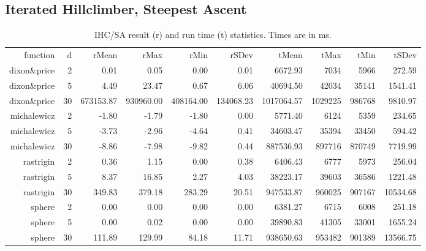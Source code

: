 \documentclass{article}
\begin{document}
    \newpage

	\subsection{Iterated Hillclimber, Steepest Ascent}
	\begin{table}[!ht]
        \centering
        {\footnotesize
        \begin{tabular}{rr|rrrrrrrr}
            function & d & rMean & rMax & rMin & rSDev & tMean & tMax & tMin & tSDev \\ 
            dixon\&price & 2 & 0.01 & 0.05 & 0.00 & 0.01 & 6672.93 & 7034 & 5966 & 272.59 \\  \hline
            dixon\&price & 5 & 4.49 & 23.47 & 0.67 & 6.06 & 40694.50 & 42034 & 35141 & 1541.41 \\  \hline
            dixon\&price & 30 & 673153.87 & 930960.00 & 408164.00 & 134068.23 & 1017064.57 & 1029225 & 986768 & 9810.97 \\  \hline
            michalewicz & 2 & -1.80 & -1.79 & -1.80 & 0.00 & 5771.40 & 6124 & 5359 & 234.65 \\  \hline
            michalewicz & 5 & -3.73 & -2.96 & -4.64 & 0.41 & 34603.47 & 35394 & 33450 & 594.42 \\  \hline
            michalewicz & 30 & -8.86 & -7.98 & -9.82 & 0.44 & 887536.93 & 897716 & 870749 & 7719.99 \\  \hline
            rastrigin & 2 & 0.36 & 1.15 & 0.00 & 0.38 & 6406.43 & 6777 & 5973 & 256.04 \\  \hline
            rastrigin & 5 & 8.37 & 16.85 & 2.27 & 4.03 & 38223.17 & 39603 & 36586 & 1221.48 \\  \hline
            rastrigin & 30 & 349.83 & 379.18 & 283.29 & 20.51 & 947533.87 & 960025 & 907167 & 10534.68 \\  \hline
            sphere & 2 & 0.00 & 0.00 & 0.00 & 0.00 & 6381.27 & 6715 & 6008 & 251.18 \\  \hline
            sphere & 5 & 0.00 & 0.02 & 0.00 & 0.00 & 39890.83 & 41305 & 33001 & 1655.24 \\  \hline
            sphere & 30 & 111.89 & 129.99 & 84.18 & 11.71 & 938650.63 & 953482 & 901389 & 13566.75 \\  \hline
            \end{tabular}
        }
        \caption{IHC/SA result (r) and run time (t) statistics. Times are in ms.}
    \end{table}
\end{document}
